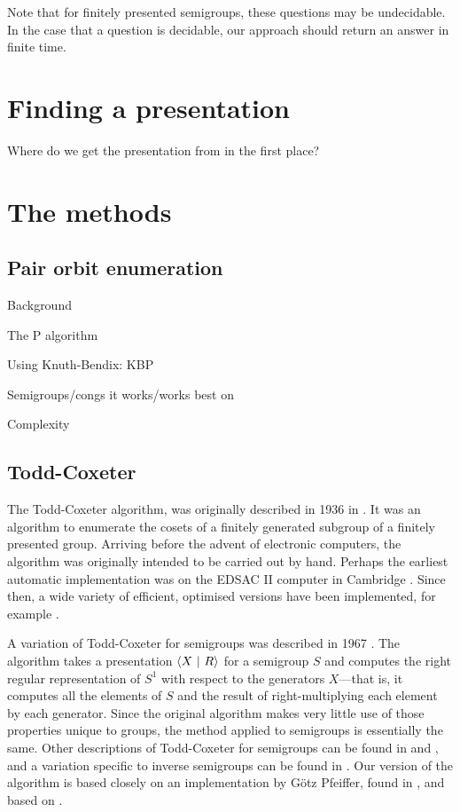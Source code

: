 Note that for finitely presented semigroups, these questions may be
undecidable.  In the case that a question is decidable, our approach should
return an answer in finite time.

\section{Finding a presentation}

Where do we get the presentation from in the first place?

\section{The methods}

\subsection{Pair orbit enumeration}
\label{sec:p}

Background

The P algorithm

Using Knuth-Bendix: KBP

Semigroups/congs it works/works best on

Complexity

\subsection{Todd-Coxeter}
\label{sec:tc}

The Todd-Coxeter algorithm, was originally described in 1936 in
\cite{todd_coxeter_1936}.  It was an algorithm to enumerate the cosets of a
finitely generated subgroup of a finitely presented group.  Arriving before the
advent of electronic computers, the algorithm was originally intended to be
carried out by hand.  Perhaps the earliest automatic implementation was on the
EDSAC II computer in Cambridge \cite{leech_1963}.  Since then, a wide variety of
efficient, optimised versions have been implemented, for example \cite{ace}.

A variation of Todd-Coxeter for semigroups was described in 1967
\cite{neumann_1967}.  The algorithm takes a presentation $\left\langle X ~\middle|~ R \right\rangle$
for a semigroup $S$ and computes the right regular representation of $S^1$ with
respect to the generators $X$---that is, it computes all the elements of $S$ and
the result of right-multiplying each element by each generator.  Since the
original algorithm makes very little use of those properties unique to groups,
the method applied to semigroups is essentially the same.  Other descriptions of
Todd-Coxeter for semigroups can be found in \cite[Chapter 12]{ruskuc_thesis} and
\cite[Chapter 1.2]{walker_thesis}, and a variation specific to inverse
semigroups can be found in \cite{cutting_thesis}.  Our version of the algorithm
is based closely on an implementation by G\"otz Pfeiffer, found in
\cite[\texttt{lib/tcsemi.gi}]{gap}, and based on \cite{walker_thesis}.

